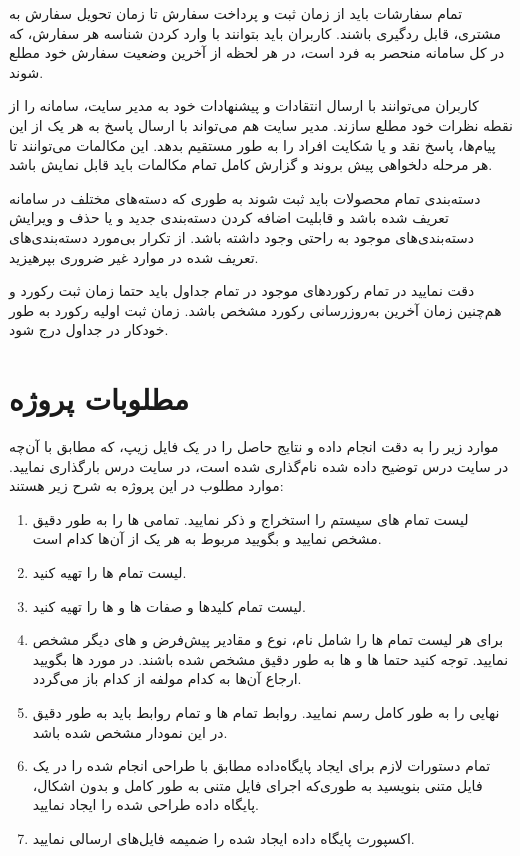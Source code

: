 \documentclass[12pt,a4paper]{article}
\begin{document}
تمام سفارشات باید از زمان ثبت و پرداخت سفارش تا زمان تحویل سفارش به مشتری، قابل ردگیری باشند. کاربران باید بتوانند با وارد کردن شناسه هر سفارش، که در کل سامانه منحصر به فرد است، در هر لحظه از آخرین وضعیت سفارش خود مطلع شوند.
\par
کاربران می‌توانند با ارسال انتقادات و پیشنهادات خود به مدیر سایت، سامانه را از نقطه نظرات خود مطلع سازند. مدیر سایت هم می‌تواند با ارسال پاسخ به هر یک از این پیام‌ها، پاسخ نقد و یا شکایت افراد را به طور مستقیم بدهد. این مکالمات می‌توانند تا هر مرحله‌ دلخواهی پیش بروند و گزارش کامل تمام مکالمات باید قابل نمایش باشد.
\par
دسته‌بندی تمام محصولات باید ثبت شوند به طوری که دسته‌های مختلف در سامانه تعریف شده باشد و قابلیت اضافه کردن دسته‌بندی جدید و یا حذف و ویرایش دسته‌بندی‌های موجود به راحتی وجود داشته باشد. از تکرار بی‌مورد دسته‌بندی‌های تعریف شده در موارد غیر ضروری بپرهیزید.
\par
دقت نمایید در تمام رکوردهای موجود در تمام جداول باید حتما زمان ثبت رکورد و هم‌چنین زمان آخرین به‌روزرسانی رکورد مشخص باشد. زمان ثبت اولیه رکورد به طور خودکار در جداول درج شود.

\section{مطلوبات پروژه} 
موارد زیر را به دقت انجام داده و نتایج حاصل را در یک فایل زیپ، که مطابق با آن‌چه در سایت درس توضیح داده شده نام‌گذاری شده است، در سایت درس بارگذاری نمایید. موارد مطلوب در این پروژه به شرح زیر هستند:


\begin{enumerate}
\item لیست تمام های سیستم را استخراج و ذکر نمایید. تمامی ها را به طور دقیق مشخص نمایید و بگویید   مربوط به هر یک از آن‌ها کدام است.

\item لیست تمام ها را تهیه کنید.


\item لیست تمام کلید‌ها و صفات ها و ها را تهیه کنید.

\item برای هر  لیست تمام ها را شامل نام، نوع و مقادیر پیش‌فرض و های دیگر مشخص نمایید. توجه کنید حتما ها و ها به طور دقیق مشخص شده باشند. در مورد ها بگویید ارجاع آن‌ها به کدام مولفه از کدام  باز می‌گردد.

\item {} نهایی را به طور کامل رسم نمایید. روابط تمام ها و  تمام روابط باید به طور دقیق در این نمودار مشخص شده باشد.

\item تمام دستورات لازم برای ایجاد پایگاه‌داده مطابق با طراحی انجام شده را در یک فایل متنی بنویسید به طوری‌که اجرای فایل متنی به طور کامل و بدون اشکال، پایگاه داده طراحی شده را ایجاد نمایید.

\item اکسپورت پایگاه داده ایجاد شده را ضمیمه فایل‌های ارسالی نمایید.
\end{enumerate}
\end{document}
